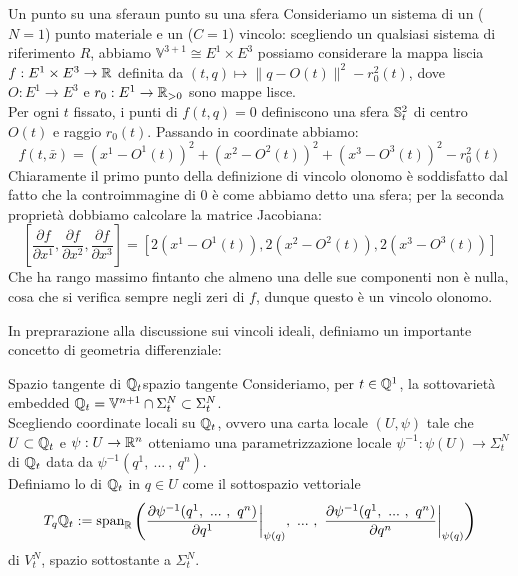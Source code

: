 \documentclass[openany]{book}
\renewcommand\V{\mathbb{V}}
\begin{document}
\begin{example}{Un punto su una sfera}{un punto su una sfera}
    Consideriamo un sistema di un ($N=1$) punto materiale e un ($C=1$) vincolo: scegliendo un qualsiasi sistema di riferimento $R$, abbiamo $\V^{3+1}\cong E^1\times E^3$ possiamo considerare la mappa liscia $f:E^1\times E^3\to\R$ definita da $(t, q)\mapsto \| q- O(t) \|^2 - r_0^2(t)$, dove $O:E^1\to E^3$ e $r_0:E^1\to\R_{>0}$ sono mappe lisce.\\
    Per ogni $t$ fissato, i punti di $f(t,q)=0$ definiscono una sfera $\S^2_t$ di centro $O(t)$ e raggio $r_0(t)$. Passando in coordinate abbiamo:
    \[ f(t,\bar x) = (x^1 - O^1(t))^2 + (x^2 -O^2(t))^2 + (x^3 -O^3(t))^2 - r_0^2(t) \]
    Chiaramente il primo punto della definizione di vincolo olonomo è soddisfatto dal fatto che la controimmagine di $0$ è come abbiamo detto una sfera; per la seconda proprietà dobbiamo calcolare la matrice Jacobiana:
    \[ \left[ \frac{\partial f}{\partial x^1}, \frac{\partial f}{\partial x^2}, \frac{\partial f}{\partial x^3} \right] = \left[ 2(x^1 -O^1(t)), 2(x^2 -O^2(t)), 2(x^3 -O^3(t)) \right] \]
    Che ha rango massimo fintanto che almeno una delle sue componenti non è nulla, cosa che si verifica sempre negli zeri di $f$, dunque questo è un vincolo olonomo.
\end{example}


In preprarazione alla discussione sui vincoli ideali, definiamo un importante concetto di geometria differenziale:

\begin{definition}{Spazio tangente di $\Q_t$}{spazio tangente}
    Consideriamo, per $t\in\Q^1$, la sottovarietà embedded $\Q_t = \V^{n+1}\cap\Sigma^N_t \subset \Sigma^N_t$.\\
    Scegliendo coordinate locali su $\Q_t$, ovvero una carta locale $(U,\psi)$ tale che $U\subset\Q_t$ e $\psi:U\to\R^n$ otteniamo una parametrizzazione locale $\psi^{-1}:\psi(U)\to\Sigma^N_t$ di $\Q_t$ data da $\psi^{-1}(q^1,\ ...\ ,\ q^n)$.\\
    Definiamo lo  di $\Q_t$ in $q \in U$ come il sottospazio vettoriale 
    \[ T_q\Q_t := \operatorname{span}_{\R}\left( \frac{\partial \psi^{-1}(q^1,\ ...\ ,\ q^n)}{\partial q^1}\bigg|_{\psi(q)},\ ...\ ,\ \frac{\partial \psi^{-1}(q^1,\ ...\ ,\ q^n)}{\partial q^n}\bigg|_{\psi(q)}  \right) \]
    di $V_t^N$, spazio sottostante a $\Sigma_t^N$.
\end{definition}
\end{document}
